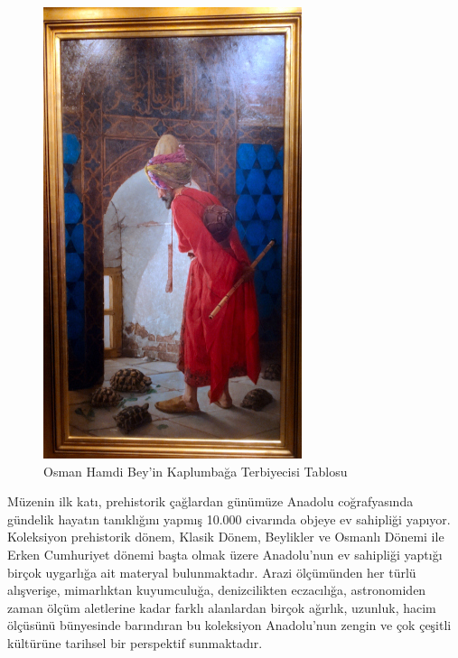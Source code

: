 \begin{figure}
    \centering
    \includegraphics[width=0.9\linewidth]{assets/kaplumbaga_terbiyecisi.jpg}
    \caption{Osman Hamdi Bey'in Kaplumbağa Terbiyecisi Tablosu}
\end{figure}
\indent Müzenin ilk katı, prehistorik çağlardan günümüze Anadolu coğrafyasında gündelik hayatın tanıklığını yapmış 10.000 civarında objeye ev sahipliği yapıyor.  Koleksiyon prehistorik dönem, Klasik Dönem, Beylikler ve Osmanlı Dönemi ile Erken Cumhuriyet dönemi başta olmak üzere Anadolu’nun ev sahipliği yaptığı birçok uygarlığa ait materyal bulunmaktadır. Arazi ölçümünden her türlü alışverişe, mimarlıktan kuyumculuğa, denizcilikten eczacılığa, astronomiden zaman ölçüm aletlerine kadar farklı alanlardan birçok ağırlık, uzunluk, hacim ölçüsünü bünyesinde barındıran bu koleksiyon Anadolu’nun zengin ve çok çeşitli kültürüne tarihsel bir perspektif sunmaktadır.